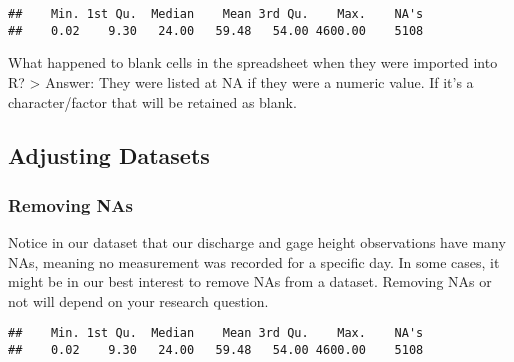 \documentclass[]{article}
\newenvironment{Shaded}{\begin{snugshade}}{\end{snugshade}}
\newcommand{\CommentTok}[1]{\textcolor[rgb]{0.56,0.35,0.01}{\textit{#1}}}
\newcommand{\KeywordTok}[1]{\textcolor[rgb]{0.13,0.29,0.53}{\textbf{#1}}}
\newcommand{\NormalTok}[1]{#1}
\newcommand{\OperatorTok}[1]{\textcolor[rgb]{0.81,0.36,0.00}{\textbf{#1}}}
\begin{document}
\begin{Shaded}
\end{Shaded}

\begin{verbatim}
##    Min. 1st Qu.  Median    Mean 3rd Qu.    Max.    NA's 
##    0.02    9.30   24.00   59.48   54.00 4600.00    5108
\end{verbatim}

What happened to blank cells in the spreadsheet when they were imported
into R? \textgreater{} Answer: They were listed at NA if they were a
numeric value. If it's a character/factor that will be retained as
blank.

\hypertarget{adjusting-datasets}{%
\subsection{Adjusting Datasets}\label{adjusting-datasets}}

\hypertarget{removing-nas}{%
\subsubsection{Removing NAs}\label{removing-nas}}

Notice in our dataset that our discharge and gage height observations
have many NAs, meaning no measurement was recorded for a specific day.
In some cases, it might be in our best interest to remove NAs from a
dataset. Removing NAs or not will depend on your research question.

\begin{Shaded}
\end{Shaded}

\begin{verbatim}
##    Min. 1st Qu.  Median    Mean 3rd Qu.    Max.    NA's 
##    0.02    9.30   24.00   59.48   54.00 4600.00    5108
\end{verbatim}

\begin{Shaded}
\end{Shaded}
\end{document}
